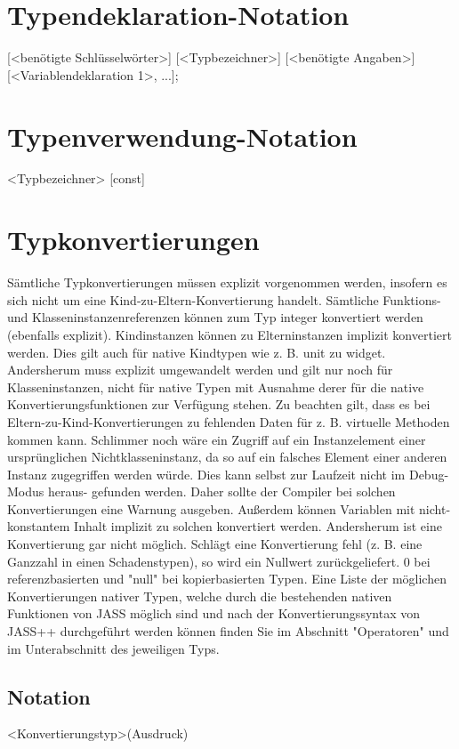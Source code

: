 \section{Typendeklaration-Notation}
[<benötigte Schlüsselwörter>] [<Typbezeichner>] [<benötigte Angaben>] [<Variablendeklaration 1>, ...];

\section{Typenverwendung-Notation}
<Typbezeichner> [const]

\section{Typkonvertierungen}
Sämtliche Typkonvertierungen müssen explizit vorgenommen werden, insofern es sich nicht
um eine Kind-zu-Eltern-Konvertierung handelt. Sämtliche Funktions- und
Klasseninstanzenreferenzen können zum Typ integer konvertiert werden (ebenfalls explizit).
Kindinstanzen können zu Elterninstanzen implizit konvertiert werden. Dies gilt auch für
native Kindtypen wie z. B. unit zu widget.
Andersherum muss explizit umgewandelt werden und gilt nur noch für Klasseninstanzen, nicht für
native Typen mit Ausnahme derer für die native Konvertierungsfunktionen zur Verfügung stehen.
Zu beachten gilt, dass es bei Eltern-zu-Kind-Konvertierungen zu fehlenden Daten für z. B.
virtuelle Methoden kommen kann. Schlimmer noch wäre ein Zugriff auf ein Instanzelement
einer ursprünglichen Nichtklasseninstanz, da so auf ein falsches Element einer anderen
Instanz zugegriffen werden würde. Dies kann selbst zur Laufzeit nicht im Debug-Modus heraus-
gefunden werden.
Daher sollte der Compiler bei solchen Konvertierungen eine Warnung ausgeben.
Außerdem können Variablen mit nicht-konstantem Inhalt implizit zu solchen konvertiert werden.
Andersherum ist eine Konvertierung gar nicht möglich.
Schlägt eine Konvertierung fehl (z. B. eine Ganzzahl in einen Schadenstypen), so wird ein Nullwert
zurückgeliefert. 0 bei referenzbasierten und "null" bei kopierbasierten Typen.
Eine Liste der möglichen Konvertierungen nativer Typen, welche durch die bestehenden nativen Funktionen
von JASS möglich sind und nach der Konvertierungssyntax von JASS++ durchgeführt werden können finden
Sie im Abschnitt "Operatoren" und im Unterabschnitt des jeweiligen Typs.

\subsection{Notation}
<Konvertierungstyp>(Ausdruck)

